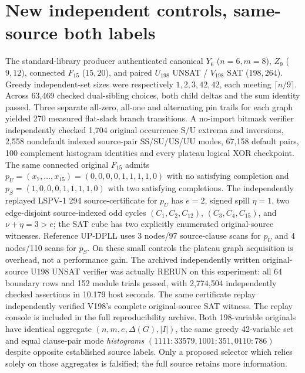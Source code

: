 \documentclass[11pt]{article}
\begin{document}
\section{New independent controls, same-source both labels}
The standard-library producer authenticated canonical $Y_6$ ($n=6,m=8$), $Z_9$ ($9,12$), connected $F_{15}$ ($15,20$), and paired $U_{198}$ UNSAT / $V_{198}$ SAT ($198,264$). Greedy independent-set sizes were respectively $1,2,3,42,42$, each meeting $\lceil n/9\rceil$. Across 63,469 checked dual-sibling choices, both child deltas and the sum identity passed. Three separate all-zero, all-one and alternating pin trails for each graph yielded 270 measured flat-slack branch transitions. A no-import bitmask verifier independently checked 1,704 original occurrence S/U extrema and inversions, 2,558 nondefault indexed source-pair SS/SU/US/UU modes, 67,158 default pairs, 100 complement histogram identities and every plateau logical XOR checkpoint.
The same connected original $F_{15}$ admits $p_U=(x_7,\ldots,x_{15})=(0,0,0,0,1,1,1,1,0)$ with no satisfying completion and $p_S=(1,0,0,0,1,1,1,1,0)$ with two satisfying completions. The independently replayed LSPV-1 294 source-certificate for $p_U$ has $e=2$, signed spill $\eta=1$, two edge-disjoint source-indexed odd cycles $(C_1,C_2,C_{12})$, $(C_3,C_4,C_{15})$, and $\nu+\eta=3>e$; the SAT cube has two explicitly enumerated original-source witnesses. Reference UP-DPLL uses 3 nodes/97 source-clause scans for $p_U$ and 4 nodes/110 scans for $p_S$. On these small controls the plateau graph acquisition is overhead, not a performance gain.
The archived independently written original-source U198 UNSAT verifier was actually RERUN on this experiment: all 64 boundary rows and 152 module trials passed, with 2,774,504 independently checked assertions in 10.179 host seconds. The same certificate replay independently verified V198's complete original-source SAT witness. The replay console is included in the full reproducibility archive. Both 198-variable originals have identical aggregate $(n,m,e,\Delta(G),|I|)$, the same greedy 42-variable set and equal clause-pair mode \emph{histograms} $(1111:33579,1001:351,0110:786)$ despite opposite established source labels. Only a proposed selector which relies solely on those aggregates is falsified; the full source retains more information.
\end{document}
